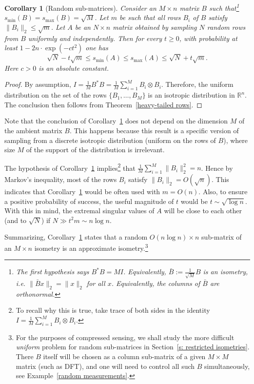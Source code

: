 \documentclass[10pt, openany]{book}
\newtheorem{corollary}[theorem]{Corollary}
\theoremstyle{remark}
\def \R {\mathbb{R}}
\def \smin {s_{\min}}
\def \smax {s_{\max}}
\begin{document}
\begin{corollary}[Random sub-matrices] 				\label{random sub-matrices}
  Consider an $M \times n$ matrix $B$ such that\footnote{The first hypothesis says 
  $B^*B = MI$. Equivalently, $\bar{B} := \frac{1}{\sqrt{M}}B$
  is an isometry, i.e. $\|\bar{B}x\|_2 = \|x\|_2$ for all $x$. Equivalently, the columns of $\bar{B}$ are orthonormal.}
  $\smin(B) = \smax(B) = \sqrt{M}$. 
  Let $m$ be such that all rows $B_i$ of $B$ satisfy $\|B_i\|_2 \le \sqrt{m}$.
  Let $A$ be an $N \times n$ matrix obtained by sampling $N$ random rows from $B$ 
  uniformly and independently. 
  Then for every $t \ge 0$, with probability at least $1 - 2n \cdot \exp(-ct^2)$ one has 
  $$
  \sqrt{N} - t \sqrt{m} \le \smin(A) \le \smax(A) \le \sqrt{N} + t \sqrt{m}.
  $$
  Here $c>0$ is an absolute constant.
\end{corollary}

\begin{proof}
By assumption, $I = \frac{1}{M} B^*B = \frac{1}{M} \sum_{i=1}^M B_i \otimes B_i$. 
Therefore, the uniform distribution on the set of the rows $\{B_1,\ldots,B_M\}$
is an isotropic distribution in $\R^n$. The conclusion then follows from Theorem~\ref{heavy-tailed rows}.  
\end{proof}

Note that the conclusion of Corollary~\ref{random sub-matrices}
does not depend on the dimension $M$ of the ambient matrix $B$. 
This happens because this result is a specific version of sampling from a discrete
isotropic distribution (uniform on the rows of $B$), where size $M$
of the support of the distribution is irrelevant. 

The hypothesis of Corollary~\ref{random sub-matrices} implies\footnote{To recall why this is true, 
take trace of both sides in the identity $I = \frac{1}{M} \sum_{i=1}^M B_i \otimes B_i$.}
that $\frac{1}{M} \sum_{i=1}^M \|B_i\|_2^2 = n$. 
Hence by Markov's inequality, most of the rows $B_i$ satisfy $\|B_i\|_2 = O(\sqrt{n})$. 
This indicates that Corollary~\ref{random sub-matrices} would be often used with $m = O(n)$.
Also, to ensure a positive probability of success, the useful magnitude of $t$ would be 
$t \sim \sqrt{\log n}$. With this in mind, the extremal singular values of $A$ will be close
to each other (and to $\sqrt{N}$) if $N \gg t^2 m \sim n \log n$.

Summarizing, Corollary~\ref{random sub-matrices} states that  
a random $O(n \log n) \times n$ sub-matrix of an $M \times n$ isometry
is an approximate isometry.\footnote{For the purposes of compressed sensing, 
we shall study the more difficult {\em uniform} 
problem for random sub-matrices in Section~\ref{s: restricted isometries}.
There $B$ itself will be chosen as a column sub-matrix of a given $M \times M$ matrix (such as DFT),
and one will need to control all such $B$ simultaneously, see Example~\ref{random measurements}.}
\end{document}
